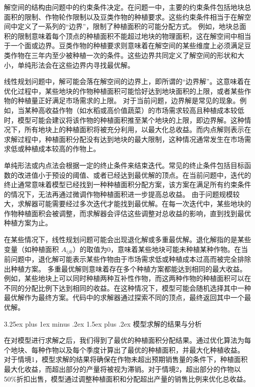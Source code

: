 \documentclass[12pt,a4paper]{nmmcm}
\makeatletter
\renewcommand\subsection{\@startsection{subsection}{2}{0pt}%
    {3.25ex plus 1ex minus .2ex}%
    {1.5ex plus .2ex}%
    {\normalfont\Large\bfseries}}
\makeatother
\begin{document}
解空间的结构由问题中的约束条件决定。在问题一中，主要的约束条件包括地块总面积的限制、作物轮作限制以及豆类作物的种植要求。这些约束条件相当于在解空间中定义了一系列的“边界”，限制了种植面积的可能分配方式。 例如，地块总面积的限制意味着每个顶点的种植面积不能超过地块的物理面积，这在解空间中相当于一个面或边界。豆类作物的种植要求则意味着在解空间的某些维度上必须满足豆类作物在三年内至少被种植一次的条件。这些边界共同定义了解空间的形状和大小，单纯形法会在这些边界内寻找最优解。

线性规划问题中，解可能会落在解空间的边界上，即所谓的“边界解”。这意味着在优化过程中，某些地块的作物种植面积可能恰好达到地块面积的上限，或者某些作物的种植量正好满足市场需求的上限。 对于当前问题，边界解是常见的现象。例如，当某种高收益作物（如水稻或高价值蔬菜）的市场需求较高且种植成本较低时，模型可能会建议将该作物的种植面积推至某个地块的上限，即边界解。这种情况下，所有地块上的种植面积将被充分利用，以最大化总收益。而内点解则表示在求解过程中，种植面积分配没有达到地块的最大限制，这种情况通常发生在市场需求低或种植成本较高的作物上。

单纯形法或内点法会根据一定的终止条件来结束迭代。常见的终止条件包括目标函数的改进值小于预设的阈值、或者已经达到最优解的顶点。在当前问题中，迭代的终止通常意味着模型已经找到一种种植面积分配方案，该方案在满足所有约束条件的情况下，无法再通过微调作物种植面积进一步提高总收益。 由于问题规模较大，求解器可能需要经过多次迭代才能找到最优解。在每一次迭代中，某些地块的作物种植面积会被调整，而求解器会评估这些调整对总收益的影响，直到找到最优种植方案为止。

在某些情况下，线性规划问题可能会出现退化解或多重最优解。退化解指的是某些变量（如种植面积 $A_{ijk}$）的取值为0，意味着某些地块可能未种植某种作物。在当前问题中，退化解可能表示某些作物由于市场需求低或种植成本过高而被完全排除出种植方案。 多重最优解则意味着存在多个种植方案都能达到相同的最大收益。例如，某些地块上可以同时种植两种互补性作物，而这两种作物的种植面积可以在不同的分配比例下达到相同的收益。在这种情况下，模型可能会随机选择其中一种最优解作为最终方案。代码中的求解器通过探索不同的顶点，最终返回其中一个最优解。


\subsection{模型求解的结果与分析}

在对模型进行求解之后，我们得到了最优的种植面积分配结果。通过优化算法为每个地块、每种作物以及每个季度计算出了最优的种植面积，并最大化种植收益。
对于情境1，模型求解的结果将确保在作物未超出预期销售量的条件下，种植面积最大化收益，而超出部分的产量将被视为滞销。对于情境2，超出部分的作物以50\%折扣出售，模型通过调整种植面积和分配超出产量的销售比例来优化总收益。
\end{document}
